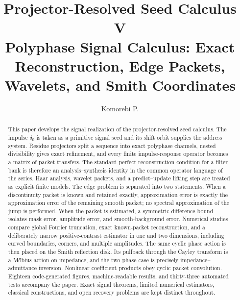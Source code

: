 \documentclass[11pt]{article}
\title{\textbf{Projector-Resolved Seed Calculus V}\\[0.45em]
\large Polyphase Signal Calculus: Exact Reconstruction, Edge Packets, Wavelets, and Smith Coordinates}
\author{Komorebi P.}
\date{}
\theoremstyle{definition}
\theoremstyle{remark}
\begin{document}
\maketitle

\begin{abstract}
This paper develops the signal realization of the projector-resolved seed calculus. The impulse $\delta_0$ is taken as a primitive signal seed and its shift orbit supplies the address system. Residue projectors split a sequence into exact polyphase channels, nested divisibility gives exact refinement, and every finite impulse-response operator becomes a matrix of packet transfers. The standard perfect-reconstruction condition for a filter bank is therefore an analysis--synthesis identity in the common operator language of the series. Haar analysis, wavelet packets, and a predict--update lifting step are treated as explicit finite models. The edge problem is separated into two statements. When a discontinuity packet is known and retained exactly, approximation error is exactly the approximation error of the remaining smooth packet; no spectral approximation of the jump is performed. When the packet is estimated, a symmetric-difference bound isolates mask error, amplitude error, and smooth-background error. Numerical studies compare global Fourier truncation, exact known-packet reconstruction, and a deliberately narrow positive-contrast estimator in one and two dimensions, including curved boundaries, corners, and multiple amplitudes. The same cyclic phase action is then placed on the Smith reflection disk. Its pullback through the Cayley transform is a M\"obius action on impedance, and the two-phase case is precisely impedance--admittance inversion. Nonlinear coefficient products obey cyclic packet convolution. Eighteen code-generated figures, machine-readable results, and thirty-three automated tests accompany the paper. Exact signal theorems, limited numerical estimators, classical constructions, and open recovery problems are kept distinct throughout.
\end{abstract}
\end{document}
